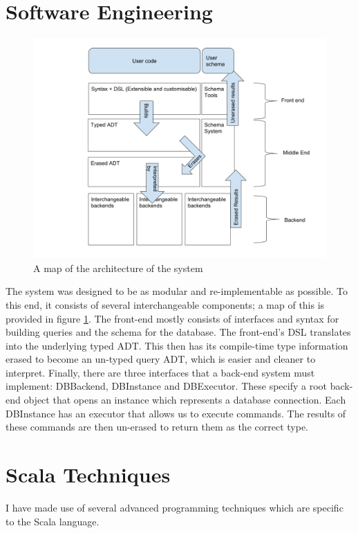 \documentclass[12pt,a4paper,twoside,openright]{report}
\begin{document}
\section{Software Engineering}

\begin{figure}[ht]
\centering
  \includegraphics[width=\textwidth]{figs/Architecture.png}
  \caption{A map of the architecture of the system}
  \label{fig:Architecture}
\end{figure}
The system was designed to be as modular and re-implementable as possible. To this end, it consists of several interchangeable components; a map of this is provided in figure \ref{fig:Architecture}. The front-end mostly consists of interfaces and syntax for building queries and the schema for the database. The front-end's DSL translates into the underlying typed ADT. This then has its compile-time type information erased to become an un-typed query ADT, which is easier and cleaner to interpret. Finally, there are three interfaces that a back-end system must implement: DBBackend, DBInstance and DBExecutor. These specify a root back-end object that opens an instance which represents a database connection. Each DBInstance has an executor that allows us to execute commands. The results of these commands are then un-erased to return them as the correct type.

\section{Scala Techniques}
I have made use of several advanced programming techniques which are specific to the Scala language.
\end{document}

